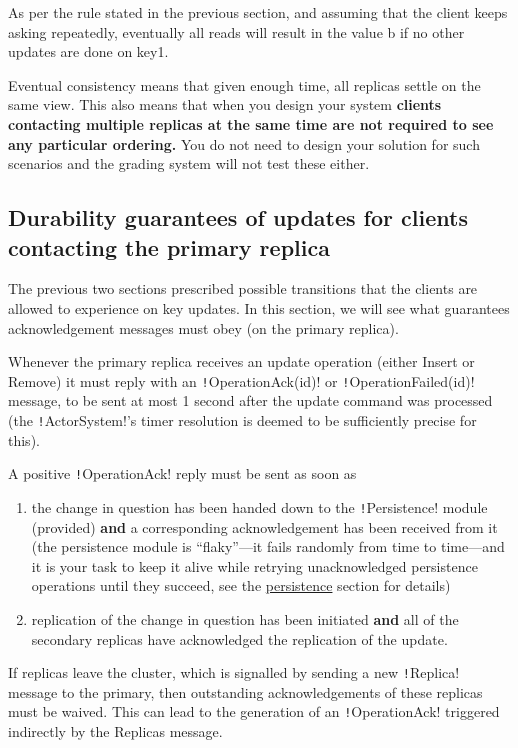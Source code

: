 \documentclass{article}
\begin{document}
As per the rule stated in the previous section, and assuming that the client keeps asking repeatedly, eventually all reads will result in the value b if no other updates are done on key1.

Eventual consistency means that given enough time, all replicas settle on the same view. This also means that when you design your system \textbf{clients contacting multiple replicas at the same time are not required to see any particular ordering.} You do not need to design your solution for such scenarios and the grading system will not test these either.

\subsection{Durability guarantees of updates for clients contacting the primary replica}

The previous two sections prescribed possible transitions that the clients are allowed to experience on key updates. In this section, we will see what guarantees acknowledgement messages must obey (on the primary replica).

Whenever the primary replica receives an update operation (either Insert or Remove) it must reply with an \texttt!OperationAck(id)! or \texttt!OperationFailed(id)! message, to be sent at most 1 second after the update command was processed (the \texttt!ActorSystem!’s timer resolution is deemed to be sufficiently precise for this).

A positive \texttt!OperationAck! reply must be sent as soon as

\begin{enumerate}
	\item the change in question has been handed down to the \texttt!Persistence! module (provided) \textbf{and} a corresponding acknowledgement has been received from it (the persistence module is ``flaky''—it fails randomly from time to time—and it is your task to keep it alive while retrying unacknowledged persistence operations until they succeed, see the \hyperref[ss:persistence]{persistence} section for details)
	\item replication of the change in question has been initiated \textbf{and} all of the secondary replicas have acknowledged the replication of the update.
\end{enumerate}

If replicas leave the cluster, which is signalled by sending a new \texttt!Replica! message to the primary, then outstanding acknowledgements of these replicas must be waived. This can lead to the generation of an \texttt!OperationAck! triggered indirectly by the Replicas message.
\end{document}
